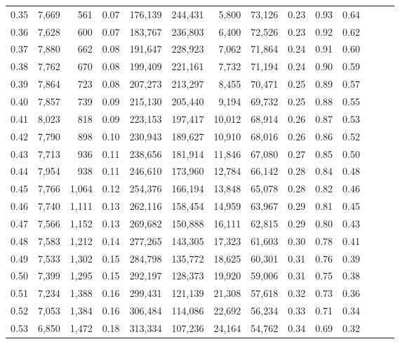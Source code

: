 \begin{tabular}{rrrrrrrrrrrrrr}
0.35 &  7,669 &    561 &  0.07 &  176,139 &  244,431 &   5,800 &  73,126 &  0.23 &  0.93 &      0.64 \\
0.36 &  7,628 &    600 &  0.07 &  183,767 &  236,803 &   6,400 &  72,526 &  0.23 &  0.92 &      0.62 \\
0.37 &  7,880 &    662 &  0.08 &  191,647 &  228,923 &   7,062 &  71,864 &  0.24 &  0.91 &      0.60 \\
0.38 &  7,762 &    670 &  0.08 &  199,409 &  221,161 &   7,732 &  71,194 &  0.24 &  0.90 &      0.59 \\
0.39 &  7,864 &    723 &  0.08 &  207,273 &  213,297 &   8,455 &  70,471 &  0.25 &  0.89 &      0.57 \\
0.40 &  7,857 &    739 &  0.09 &  215,130 &  205,440 &   9,194 &  69,732 &  0.25 &  0.88 &      0.55 \\
0.41 &  8,023 &    818 &  0.09 &  223,153 &  197,417 &  10,012 &  68,914 &  0.26 &  0.87 &      0.53 \\
0.42 &  7,790 &    898 &  0.10 &  230,943 &  189,627 &  10,910 &  68,016 &  0.26 &  0.86 &      0.52 \\
0.43 &  7,713 &    936 &  0.11 &  238,656 &  181,914 &  11,846 &  67,080 &  0.27 &  0.85 &      0.50 \\
0.44 &  7,954 &    938 &  0.11 &  246,610 &  173,960 &  12,784 &  66,142 &  0.28 &  0.84 &      0.48 \\
0.45 &  7,766 &  1,064 &  0.12 &  254,376 &  166,194 &  13,848 &  65,078 &  0.28 &  0.82 &      0.46 \\
0.46 &  7,740 &  1,111 &  0.13 &  262,116 &  158,454 &  14,959 &  63,967 &  0.29 &  0.81 &      0.45 \\
0.47 &  7,566 &  1,152 &  0.13 &  269,682 &  150,888 &  16,111 &  62,815 &  0.29 &  0.80 &      0.43 \\
0.48 &  7,583 &  1,212 &  0.14 &  277,265 &  143,305 &  17,323 &  61,603 &  0.30 &  0.78 &      0.41 \\
0.49 &  7,533 &  1,302 &  0.15 &  284,798 &  135,772 &  18,625 &  60,301 &  0.31 &  0.76 &      0.39 \\
0.50 &  7,399 &  1,295 &  0.15 &  292,197 &  128,373 &  19,920 &  59,006 &  0.31 &  0.75 &      0.38 \\
0.51 &  7,234 &  1,388 &  0.16 &  299,431 &  121,139 &  21,308 &  57,618 &  0.32 &  0.73 &      0.36 \\
0.52 &  7,053 &  1,384 &  0.16 &  306,484 &  114,086 &  22,692 &  56,234 &  0.33 &  0.71 &      0.34 \\
0.53 &  6,850 &  1,472 &  0.18 &  313,334 &  107,236 &  24,164 &  54,762 &  0.34 &  0.69 &      0.32 \\

\end{tabular}
